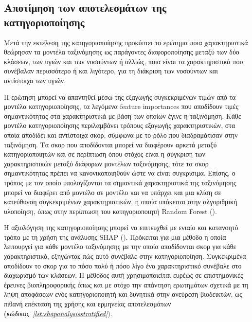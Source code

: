\documentclass[12pt]{report}
\begin{document}
        \subsection{Αποτίμηση των αποτελεσμάτων της κατηγοριοποίησης}
            Μετά την εκτέλεση της κατηγοριοποίησης προκύπτει το ερώτημα ποια χαρακτηριστικά θεώρησαν τα μοντέλα ταξινόμησης ως παράγοντες διαφοροποίησης μεταξύ των δύο κλάσεων, των υγιών και των νοσούντων ή αλλιώς, ποια είναι τα χαρακτηριστικά που συνέβαλαν περισσότερο ή και λιγότερο, για τη διάκριση των νοσούντων και αντίστοιχα των υγιών.
        \par
            Η ερώτηση μπορεί να απαντηθεί μέσω της εξαγωγής συγκεκριμένων τιμών από τα μοντέλα κατηγοριοποίησης, τα λεγόμενα feature importances που αποδίδουν τιμές σημαντικότητας στα χαρακτηριστικά με βάση των οποίων έγινε η ταξινόμηση. Κάθε μοντέλο κατηγοριοποίησης περιλαμβάνει τρόπους εξαγωγής χαρακτηριστικών, στα οποία αποδίδει και αντίστοιχα σκορ, σύμφωνα με το ρόλο που διαδραμάτισαν στην ταξινόμηση. Τα σκορ που αποδίδονται μπορεί να διαφέρουν αρκετά μεταξύ κατηγοριοποιητών και σε περίπτωση όπου στόχος είναι η σύγκριση των χαρακτηριστικών μεταξύ διάφορων μοντέλων ταξινόμησης, τότε τα σκορ σημαντικότητας πρέπει να κανονικοποιηθούν ώστε να είναι συγκρίσιμα. Επίσης, ο τρόπος με τον οποίο υπολογίζονται τα σημαντικά χαρακτηριστικά της ταξινόμησης μπορεί να διαφέρει από μοντέλο σε μοντέλο και να υπάρχει και μια κλίση σε κατεύθυνση συγκεκριμένων χαρακτηριστικών, η οποία υπόκειται στην αλγοριθμική υλοποίηση, όπως στην περίπτωση του κατηγοριοποιητή Random Forest (\emph{\cite{Strobl2007BiasSolution}}).
        \par
            Η αξιολόγηση της κατηγοριοποίησης μπορεί να επιτευχθεί με ενιαίο και κατανοητό τρόπο με τη χρήση της ανάλυσης SHAP (\emph{\cite{Lundberg2017APredictions}}). Πρόκειται για μια μέθοδο η οποία λειτουργεί για κάθε μοντέλο ταξινόμησης με την οποία αποδίδονται σκορ για κάθε χαρακτηριστικό, εξηγώντας πώς αυτό συνέβαλε στην κατηγοριοποίηση. Συγκεκριμένα αποδίδουν το σκορ για το πόσο πολύ ή πόσο λίγο ένα χαρακτηριστικό συνέβαλε στο διαχωρισμό των κλάσεων. Η μέθοδος αυτή χρησιμοποιείται ευρέως σε επιστημονικές έρευνες βιοπληροφορικής όπως \cite{Meral2025Fine-TunedAnalysis} και \cite{FilaliRazzouki2025ExplainingDisease} με στόχο την απάντηση ερωτημάτων σχετικά με τη λήψη αποφάσεων ενός κατηγοριοποιητή και δυνητικά στην ανεύρεση βιοδεικτών, ως πιθανή επέκταση της χρήσης και ερμηνείας αποτελεσμάτων (\emph{κώδικας~\ref{lst:shapanalysisstratified}}).
\end{document}
